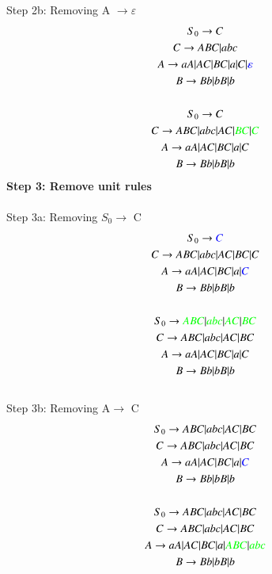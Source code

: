 \documentclass[12pt,letterpaper]{article}
\begin{document}
		Step 2b: Removing A $\rightarrow \varepsilon$
		\begin{gather*}
			S_0 \rightarrow C\\
			C \rightarrow ABC\arrowvert abc\\
			A \rightarrow aA\arrowvert AC\arrowvert BC\arrowvert a\arrowvert C\arrowvert \textcolor{blue}{\varepsilon}\\
			B \rightarrow Bb\arrowvert bB\arrowvert b\\
			\\S_0 \rightarrow C\\
			C \rightarrow ABC\arrowvert abc\arrowvert AC\arrowvert \textcolor{green}{BC}\arrowvert \textcolor{green}{C}\\
			A \rightarrow aA\arrowvert AC\arrowvert BC\arrowvert a\arrowvert C\\
			B \rightarrow Bb\arrowvert bB\arrowvert b
		\end{gather*}
		\textbf{Step 3: Remove unit rules}\\
		\\Step 3a: Removing $S_0\rightarrow$ C
		\begin{gather*}
			S_0 \rightarrow \textcolor{blue}{C}\\
			C \rightarrow ABC\arrowvert abc\arrowvert AC\arrowvert BC\arrowvert C\\
			A \rightarrow aA\arrowvert AC\arrowvert BC\arrowvert a\arrowvert \textcolor{blue}{C}\\
			B \rightarrow Bb\arrowvert bB\arrowvert b\\
			\\S_0 \rightarrow \textcolor{green}{ABC}\arrowvert \textcolor{green}{abc}\arrowvert \textcolor{green}{AC}\arrowvert \textcolor{green}{BC}\\
			C \rightarrow ABC\arrowvert abc\arrowvert AC\arrowvert BC\\
			A \rightarrow aA\arrowvert AC\arrowvert BC\arrowvert a\arrowvert C\\
			B \rightarrow Bb\arrowvert bB\arrowvert b
		\end{gather*}
		\\Step 3b: Removing A$\rightarrow$ C
		\begin{gather*}
			S_0 \rightarrow ABC\arrowvert abc\arrowvert AC\arrowvert BC\\
			C \rightarrow ABC\arrowvert abc\arrowvert AC\arrowvert BC\\
			A \rightarrow aA\arrowvert AC\arrowvert BC\arrowvert a\arrowvert \textcolor{blue}{C}\\
			B \rightarrow Bb\arrowvert bB\arrowvert b\\
			\\S_0 \rightarrow ABC\arrowvert abc\arrowvert AC\arrowvert BC\\
			C \rightarrow ABC\arrowvert abc\arrowvert AC\arrowvert BC\\
			A \rightarrow aA\arrowvert AC\arrowvert BC\arrowvert a\arrowvert \textcolor{green}{ABC}\arrowvert \textcolor{green}{abc}\\
			B \rightarrow Bb\arrowvert bB\arrowvert b\\
		\end{gather*}
\end{document}
